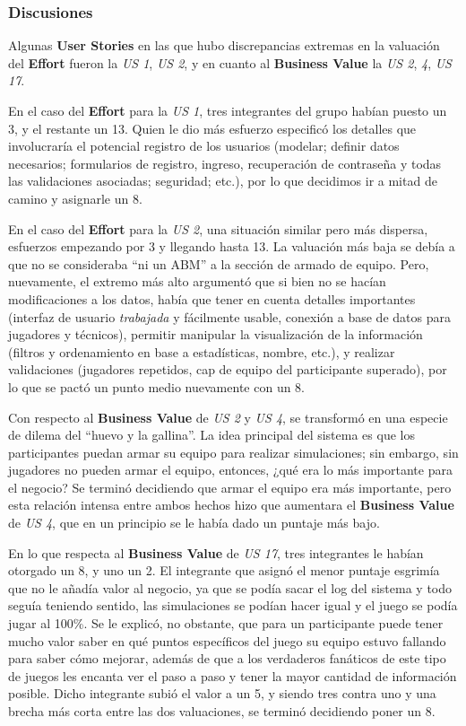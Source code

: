 \subsubsection*{Discusiones}
Algunas \textbf{User Stories} en las que hubo discrepancias extremas en la valuación del \textbf{Effort} fueron la \emph{US 1}, \emph{US 2}, y en cuanto al \textbf{Business Value} la \emph{US 2}, \emph{4}, \emph{US 17}.

En el caso del \textbf{Effort} para la \emph{US 1}, tres integrantes del grupo habían puesto un 3, y el restante un 13. Quien le dio más esfuerzo especificó los detalles que involucraría el potencial registro de los usuarios (modelar; definir datos necesarios; formularios de registro, ingreso, recuperación de contraseña y todas las validaciones asociadas; seguridad; etc.), por lo que decidimos ir a mitad de camino y asignarle un 8.

En el caso del \textbf{Effort} para la \emph{US 2}, una situación similar pero más dispersa, esfuerzos empezando por 3 y llegando hasta 13. La valuación más baja se debía a que no se consideraba ``ni un ABM'' a la sección de armado de equipo. Pero, nuevamente, el extremo más alto argumentó que si bien no se hacían modificaciones a los datos, había que tener en cuenta detalles importantes (interfaz de usuario \emph{trabajada} y fácilmente usable, conexión a base de datos para jugadores y técnicos), permitir manipular la visualización de la información (filtros y ordenamiento en base a estadísticas, nombre, etc.), y realizar validaciones (jugadores repetidos, cap de equipo del participante superado), por lo que se pactó un punto medio nuevamente con un 8.

Con respecto al \textbf{Business Value} de \emph{US 2} y \emph{US 4}, se transformó en una especie de dilema del ``huevo y la gallina''. La idea principal del sistema es que los participantes puedan armar su equipo para realizar simulaciones; sin embargo, sin jugadores no pueden armar el equipo, entonces, ¿qué era lo más importante para el negocio? Se terminó decidiendo que armar el equipo era más importante, pero esta relación intensa entre ambos hechos hizo que aumentara el \textbf{Business Value} de \emph{US 4}, que en un principio se le había dado un puntaje más bajo.

En lo que respecta al \textbf{Business Value} de \emph{US 17}, tres integrantes le habían otorgado un 8, y uno un 2. El integrante que asignó el menor puntaje esgrimía que no le añadía valor al negocio, ya que se podía sacar el log del sistema y todo seguía teniendo sentido, las simulaciones se podían hacer igual y el juego se podía jugar al 100\%. Se le explicó, no obstante, que para un participante puede tener mucho valor saber en qué puntos específicos del juego su equipo estuvo fallando para saber cómo mejorar, además de que a los verdaderos fanáticos de este tipo de juegos les encanta ver el paso a paso y tener la mayor cantidad de información posible. Dicho integrante subió el valor a un 5, y siendo tres contra uno y una brecha más corta entre las dos valuaciones, se terminó decidiendo poner un 8.
